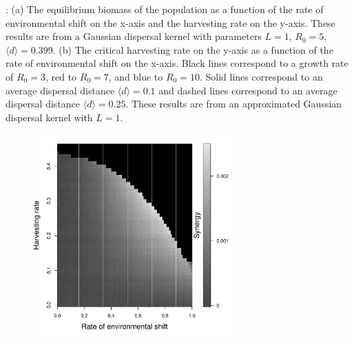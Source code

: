 \documentclass[12pt,english]{article}
\begin{document}
\begin{figure}[htbp]
\caption{%
}

\label{baseline}
\end{figure}

\pagebreak

: (a) The equilibrium biomass of the population as a function of the rate of environmental shift on the x-axis and the harvesting rate on the y-axis. These results are from a Gaussian dispersal kernel with parameters $L=1$, $R_0=5$, $\langle d \rangle = 0.399$.  (b) The critical harvesting rate on the y-axis as a function of the rate of environmental shift on the x-axis.  Black lines correspond to a growth rate of $R_0=3$, red to $R_0=7$, and blue to $R_0=10$.  Solid lines correspond to an average dispersal distance $\langle d \rangle =0.1$ and dashed lines correspond to an average dispersal distance $\langle d \rangle =0.25$.  These results are from an approximated Gaussian dispersal kernel with $L=1$.

\pagebreak

\begin{figure}[htbp]
\begin{center}
\includegraphics[width=3in]{plots/synergy.pdf}
\caption{
}
\label{Synergy}
\end{center}
\end{figure}
\end{document}
